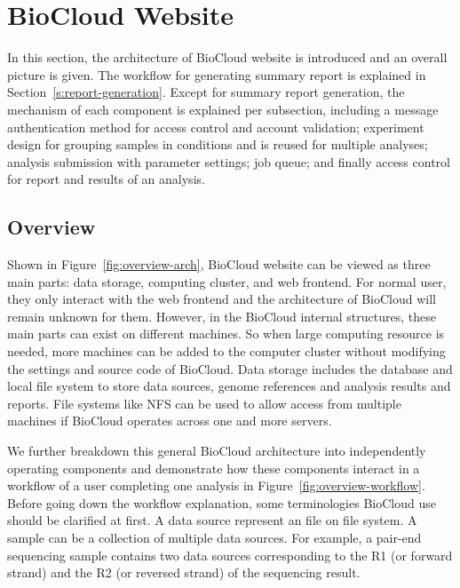 \section{BioCloud Website}
\label{s:biocloud-website}

In this section, the architecture of BioCloud website is introduced and an
overall picture is given. The workflow for generating summary report is
explained in Section~\ref{s:report-generation}. Except for summary report
generation, the mechanism of each component is explained per subsection,
including a message authentication method for access control and account
validation; experiment design for grouping samples in conditions and is reused
for multiple analyses; analysis submission with parameter settings; job queue;
and finally access control for report and results of an analysis.



\subsection{Overview}

Shown in Figure~\ref{fig:overview-arch}, BioCloud website can be viewed as
three main parts: data storage, computing cluster, and web frontend. For normal
user, they only interact with the web frontend and the architecture of BioCloud
will remain unknown for them. However, in the BioCloud internal structures,
these main parts can exist on different machines. So when large computing
resource is needed, more machines can be added to the computer cluster without
modifying the settings and source code of BioCloud. Data storage includes the
database and local file system to store data sources, genome references and
analysis results and reports. File systems like NFS can be used to allow access
from multiple machines if BioCloud operates across one and more servers.



We further breakdown this general BioCloud architecture into independently
operating components and demonstrate how these components interact in a
workflow of a user completing one analysis in
Figure~\ref{fig:overview-workflow}. Before going down the workflow explanation,
some terminologies BioCloud use should be clarified at first. A data source
represent an file on file system. A sample can be a collection of multiple data
sources. For example, a pair-end sequencing sample contains two data sources
corresponding to the R1 (or forward strand) and the R2 (or reversed strand) of
the sequencing result.

